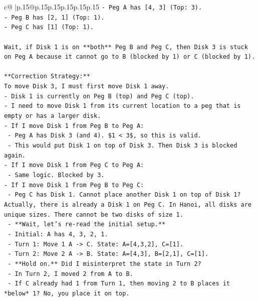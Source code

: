 \documentclass{article}
\begin{document}
{\begin{supertabular}{c@{$\;$}|p{.15\linewidth}@{}p{.15\linewidth}p{.15\linewidth}p{.15\linewidth}p{.15\linewidth}p{.15\linewidth}}
{{{\texttt{{-} Peg A has {[}4, 3{]} (Top: 3).} \\
\texttt{{-} Peg B has {[}2, 1{]} (Top: 1).} \\
\texttt{{-} Peg C has {[}1{]} (Top: 1).} \\
\\ 
\texttt{Wait, if Disk 1 is on **both** Peg B and Peg C, then Disk 3 is stuck on Peg A because it cannot go to B (blocked by 1) or C (blocked by 1).} \\
\\ 
\texttt{**Correction Strategy:**} \\
\texttt{To move Disk 3, I must first move Disk 1 away.} \\
\texttt{{-} Disk 1 is currently on Peg B (top) and Peg C (top).} \\
\texttt{{-} I need to move Disk 1 from its current location to a peg that is empty or has a larger disk.} \\
\texttt{{-} If I move Disk 1 from Peg B to Peg A:} \\
\texttt{  {-} Peg A has Disk 3 (and 4). \$1 < 3\$, so this is valid.} \\
\texttt{  {-} This would put Disk 1 on top of Disk 3. Then Disk 3 is blocked again.} \\
\texttt{{-} If I move Disk 1 from Peg C to Peg A:} \\
\texttt{  {-} Same logic. Blocked by 3.} \\
\texttt{{-} If I move Disk 1 from Peg B to Peg C:} \\
\texttt{  {-} Peg C has Disk 1. Cannot place another Disk 1 on top of Disk 1? Actually, there is already a Disk 1 on Peg C. In Hanoi, all disks are unique sizes. There cannot be two disks of size 1.} \\
\texttt{  {-} **Wait, let's re{-}read the initial setup.**} \\
\texttt{  {-} Initial: A has 4, 3, 2, 1.} \\
\texttt{  {-} Turn 1: Move 1 A {-}> C. State: A={[}4,3,2{]}, C={[}1{]}.} \\
\texttt{  {-} Turn 2: Move 2 A {-}> B. State: A={[}4,3{]}, B={[}2,1{]}, C={[}1{]}.} \\
\texttt{  {-} **Hold on.** Did I misinterpret the state in Turn 2?} \\
\texttt{  {-} In Turn 2, I moved 2 from A to B.} \\
\texttt{  {-} If C already had 1 from Turn 1, then moving 2 to B places it *below* 1? No, you place it on top.} \\
}}}
\end{supertabular}}
\end{document}
